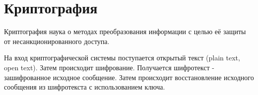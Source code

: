 \section{Криптография}

Криптография  наука о методах преобразования информации с целью её защиты от несанкционированного доступа.

На вход криптографической системы поступается открытый текст (plain text, open text). Затем происходит шифрование. Получается шифротекст - зашифрованное исходное сообщение. Затем происходит восстановление исходного сообщения из шифротекста с использованием ключа.

